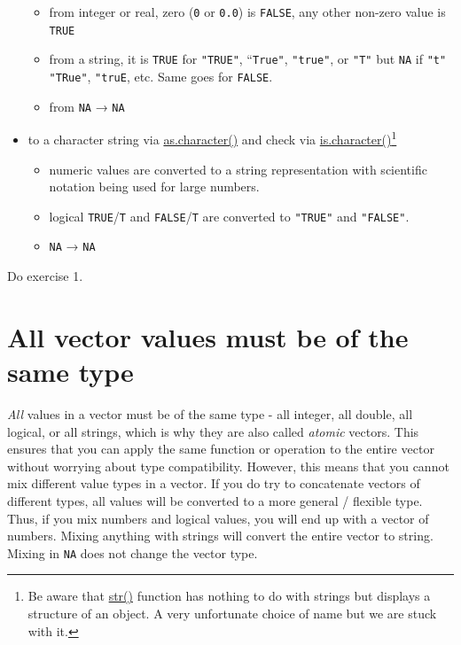 \documentclass[
]{book}
\providecommand{\tightlist}{%
  \setlength{\itemsep}{0pt}\setlength{\parskip}{0pt}}
\begin{document}
\begin{itemize}
  \begin{itemize}
  \tightlist
  \item
    from integer or real, zero (\texttt{0} or \texttt{0.0}) is \texttt{FALSE}, any other non-zero value is \texttt{TRUE}
  \item
    from a string, it is \texttt{TRUE} for \texttt{"TRUE"}, ``\texttt{True"}, \texttt{"true"}, or \texttt{"T"} but \texttt{NA} if \texttt{"t"} \texttt{"TRue"}, \texttt{"truE}, etc. Same goes for \texttt{FALSE}.
  \item
    from \texttt{NA} → \texttt{NA}
  \end{itemize}
\item
  to a character string via \href{(https://stat.ethz.ch/R-manual/R-devel/library/base/html/character.html)}{as.character()} and check via \href{(https://stat.ethz.ch/R-manual/R-devel/library/base/html/character.html)}{is.character()}\footnote{Be aware that \href{https://stat.ethz.ch/R-manual/R-devel/library/utils/html/str.html}{str()} function has nothing to do with strings but displays a structure of an object. A very unfortunate choice of name but we are stuck with it.}

  \begin{itemize}
  \tightlist
  \item
    numeric values are converted to a string representation with scientific notation being used for large numbers.
  \item
    logical \texttt{TRUE}/\texttt{T} and \texttt{FALSE}/\texttt{T} are converted to \texttt{"TRUE"} and \texttt{"FALSE"}.
  \item
    \texttt{NA} → \texttt{NA}
  \end{itemize}
\end{itemize}

Do exercise 1.

\hypertarget{vectors-are-homogeneous}{%
\section{All vector values must be of the same type}\label{vectors-are-homogeneous}}

\emph{All} values in a vector must be of the same type - all integer, all double, all logical, or all strings, which is why they are also called \emph{atomic} vectors. This ensures that you can apply the same function or operation to the entire vector without worrying about type compatibility. However, this means that you cannot mix different value types in a vector. If you do try to concatenate vectors of different types, all values will be converted to a more general / flexible type. Thus, if you mix numbers and logical values, you will end up with a vector of numbers. Mixing anything with strings will convert the entire vector to string. Mixing in \texttt{NA} does not change the vector type.
\end{document}
